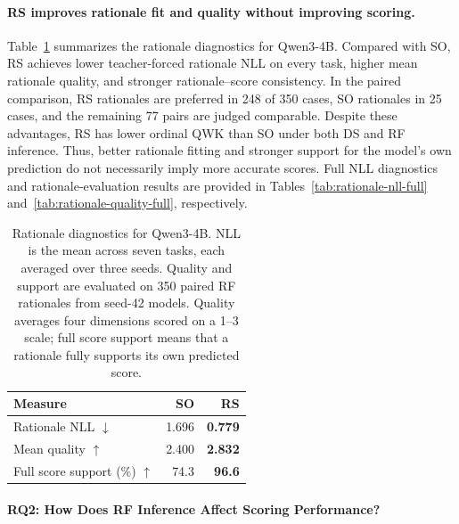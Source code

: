 \paragraph{RS improves rationale fit and quality without improving scoring.}
Table~\ref{tab:rationale-summary} summarizes the rationale diagnostics
for Qwen3-4B.
Compared with SO, RS achieves lower teacher-forced rationale NLL
on every task, higher mean rationale quality,
and stronger rationale--score consistency.
In the paired comparison, RS rationales are preferred in 248 of
350 cases, SO rationales in 25 cases, and the remaining 77 pairs
are judged comparable.
Despite these advantages, RS has lower ordinal QWK than SO
under both DS and RF inference.
Thus, better rationale fitting and stronger support for the
model's own prediction do not necessarily imply more accurate scores.
Full NLL diagnostics and rationale-evaluation results are provided
in Tables~\ref{tab:rationale-nll-full}
and~\ref{tab:rationale-quality-full}, respectively.

\begin{table}[t]
\centering
\small
\setlength{\tabcolsep}{5pt}
\begin{tabular*}{\columnwidth}{@{\extracolsep{\fill}}lrr@{}}
\toprule
Measure & SO & RS \\
\midrule
Rationale NLL $\downarrow$
    & 1.696 & \textbf{0.779} \\
Mean quality $\uparrow$
    & 2.400 & \textbf{2.832} \\
Full score support (\%) $\uparrow$
    & 74.3 & \textbf{96.6} \\
\bottomrule
\end{tabular*}
\caption{
Rationale diagnostics for Qwen3-4B.
NLL is the mean across seven tasks, each averaged over three seeds.
Quality and support are evaluated on 350 paired RF rationales
from seed-42 models.
Quality averages four dimensions scored on a 1--3 scale;
full score support means that a rationale fully supports
its own predicted score.
}
\label{tab:rationale-summary}
\end{table}

\paragraph{RQ2: How Does RF Inference Affect Scoring Performance?}

